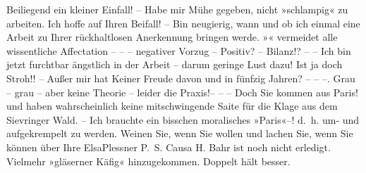 \pstart
           {\pb}Beiliegend ein kleiner Einfall! – Habe mir Mühe gegeben, nicht
               »schlampig« zu arbeiten. Ich hoffe auf Ihren Beifall! – Bin neugierig, wann und ob
               ich einmal eine Arbeit zu Ihrer rückhaltlosen Anerkennung bringen werde. »\label{K_L03695-4v}\label{K_L03695-4}« vermeidet alle wissentliche Affectation – – – negativer Vorzug –
               Positiv? – Bilanz!? – – Ich bin jetzt furchtbar ängstlich in der Arbeit – darum
               geringe Lust dazu! Ist ja doch Stroh!! – Außer mir hat Keiner Freude davon und in
               fünfzig Jahren? – – –. Grau – grau – aber keine Theorie – leider die Praxis!– – –
               Doch Sie kommen aus Paris! und haben
               wahrscheinlich keine mitschwingende Saite für die Klage aus dem Sievringer Wald. – Ich brauchte ein bisschen moralisches »Paris«–! d. h. um- und aufgekrempelt zu werden.
               Weinen Sie, wenn Sie wollen und lachen Sie, wenn Sie können über Ihre\pend
           \pstart \spacefill\mbox{ElsaPlessner}\pend{}
\pstart
           \noindent{}P. S. Causa H. Bahr ist noch nicht
                  erledigt. Vielmehr »gläserner Käfig«
                  hinzugekommen. Doppelt hält besser.\pend
           \endnumbering{}
\begin{anhang}
\end{anhang}
      